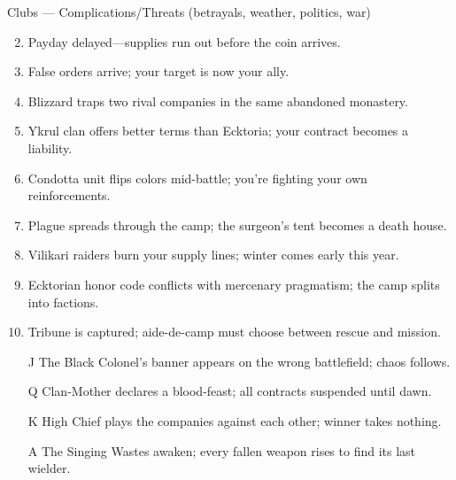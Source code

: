 Clubs --- Complications/Threats (betrayals, weather, politics, war)
\begin{enumerate}
\setcounter{enumi}{1}
\item Payday delayed---supplies run out before the coin arrives.
\item False orders arrive; your target is now your ally.
\item Blizzard traps two rival companies in the same abandoned monastery.
\item Ykrul clan offers better terms than Ecktoria; your contract becomes a liability.
\item Condotta unit flips colors mid-battle; you're fighting your own reinforcements.
\item Plague spreads through the camp; the surgeon's tent becomes a death house.
\item Vilikari raiders burn your supply lines; winter comes early this year.
\item Ecktorian honor code conflicts with mercenary pragmatism; the camp splits into factions.
\item Tribune is captured; aide-de-camp must choose between rescue and mission.
\item[J] The Black Colonel's banner appears on the wrong battlefield; chaos follows.
\item[Q] Clan-Mother declares a blood-feast; all contracts suspended until dawn.
\item[K] High Chief plays the companies against each other; winner takes nothing.
\item[A] The Singing Wastes awaken; every fallen weapon rises to find its last wielder.
\end{enumerate}

